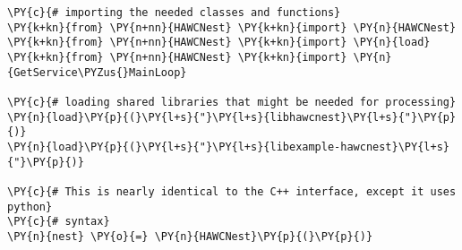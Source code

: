 \begin{Verbatim}[commandchars=\\\{\}]
\PY{c}{# importing the needed classes and functions}
\PY{k+kn}{from} \PY{n+nn}{HAWCNest} \PY{k+kn}{import} \PY{n}{HAWCNest}
\PY{k+kn}{from} \PY{n+nn}{HAWCNest} \PY{k+kn}{import} \PY{n}{load}
\PY{k+kn}{from} \PY{n+nn}{HAWCNest} \PY{k+kn}{import} \PY{n}{GetService\PYZus{}MainLoop}

\PY{c}{# loading shared libraries that might be needed for processing}
\PY{n}{load}\PY{p}{(}\PY{l+s}{"}\PY{l+s}{libhawcnest}\PY{l+s}{"}\PY{p}{)}
\PY{n}{load}\PY{p}{(}\PY{l+s}{"}\PY{l+s}{libexample-hawcnest}\PY{l+s}{"}\PY{p}{)}

\PY{c}{# This is nearly identical to the C++ interface, except it uses python}
\PY{c}{# syntax}
\PY{n}{nest} \PY{o}{=} \PY{n}{HAWCNest}\PY{p}{(}\PY{p}{)}


\end{Verbatim}
